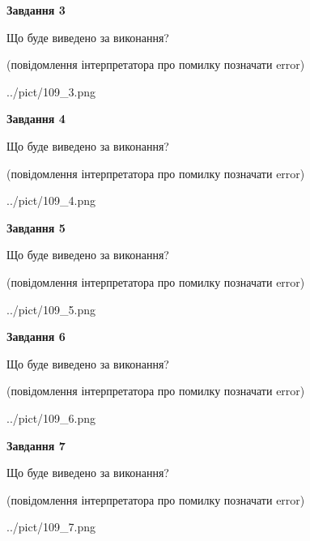 \documentclass[12pt, ukrainian]{article}
\begin{document}
{\begin {large}
{\begin {center}\textbf{Завдання 3}\end {center}}\par
Що буде виведено за виконання?\par
 (повідомлення інтерпретатора про помилку позначати error)\par
\begin{center}
	{../pict/109_3.png}
\end{center}
\newpage

{\begin {center}\textbf{Завдання 4}\end {center}}\par
Що буде виведено за виконання?\par
 (повідомлення інтерпретатора про помилку позначати error)\par
\begin{center}
	{../pict/109_4.png}
\end{center}
\newpage

{\begin {center}\textbf{Завдання 5}\end {center}}\par
Що буде виведено за виконання?\par
 (повідомлення інтерпретатора про помилку позначати error)\par
\begin{center}
	{../pict/109_5.png}
\end{center}
\newpage

{\begin {center}\textbf{Завдання 6}\end {center}}\par
Що буде виведено за виконання?\par
 (повідомлення інтерпретатора про помилку позначати error)\par
\begin{center}
	{../pict/109_6.png}
\end{center}
\newpage

{\begin {center}\textbf{Завдання 7}\end {center}}\par
Що буде виведено за виконання?\par
 (повідомлення інтерпретатора про помилку позначати error)\par
\begin{center}
	{../pict/109_7.png}
\end{center}
\newpage


\end{large}}
\end{document}

